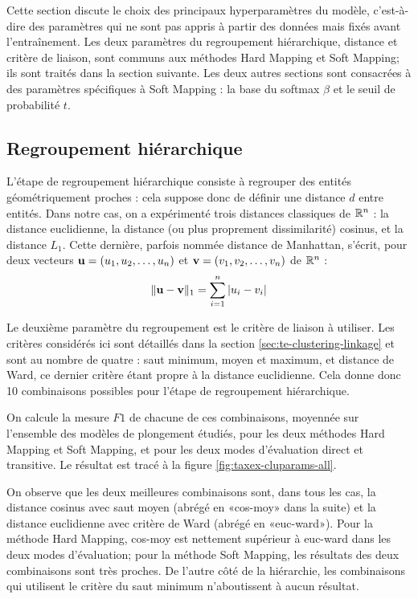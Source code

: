 Cette section discute le choix des principaux hyperparamètres du modèle, c'est-à-dire des paramètres qui ne sont pas appris à partir des données mais fixés avant l'entraînement. Les deux paramètres du regroupement hiérarchique, distance et critère de liaison, sont communs aux méthodes Hard Mapping et Soft Mapping; ils sont traités dans la section suivante. Les deux autres sections sont consacrées à des paramètres spécifiques à Soft Mapping : la base du softmax $\beta$ et le seuil de probabilité $t$.

\subsection{Regroupement hiérarchique}

L'étape de regroupement hiérarchique consiste à regrouper des entités géométriquement proches : cela suppose donc de définir une distance $d$ entre entités. Dans notre cas, on a expérimenté trois distances classiques de $\R^n$ : la distance euclidienne,  la distance (ou plus proprement dissimilarité) cosinus, et la distance $L_1$. Cette dernière, parfois nommée distance de Manhattan, s'écrit, pour deux vecteurs $\bf{u} = (u_1, u_2, \ldots, u_n)$ et $\bf{v} = (v_1, v_2, \ldots, v_n)$ de $\R^n$ :
\begin{equation}
    \| \bf{u - v} \|_1 = \sum_{i=1}^{n} | u_i - v_i |
\end{equation}

Le deuxième paramètre du regroupement est le critère de liaison à utiliser. Les critères considérés ici sont détaillés dans la section \ref{sec:te-clustering-linkage} et sont au nombre de quatre : saut minimum, moyen et maximum, et distance de Ward, ce dernier critère étant propre à la distance euclidienne. Cela donne donc 10 combinaisons possibles pour l'étape de regroupement hiérarchique.

On calcule la mesure $F1$ de chacune de ces combinaisons, moyennée sur l'ensemble des modèles de plongement étudiés, pour les deux méthodes Hard Mapping et Soft Mapping, et pour les deux modes d'évaluation direct et transitive. Le résultat est tracé à la figure \ref{fig:taxex-cluparams-all}.

On observe que les deux meilleures combinaisons sont, dans tous les cas, la distance cosinus avec saut moyen (abrégé en «cos-moy» dans la suite) et la distance euclidienne avec critère de Ward (abrégé en «euc-ward»). Pour la méthode Hard Mapping, cos-moy est nettement supérieur à euc-ward dans les deux modes d'évaluation; pour la méthode Soft Mapping, les résultats des deux combinaisons sont très proches. De l'autre côté de la hiérarchie, les combinaisons qui utilisent le critère du saut minimum n'aboutissent à aucun résultat. 

